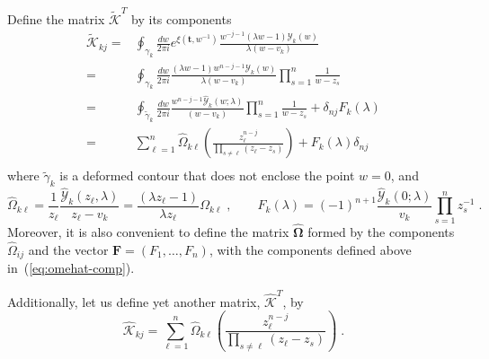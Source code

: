 \documentclass[a4paper,12pt]{amsart}
\begin{document}
Define the matrix \(\widetilde{\bm{\mathcal{K}}}^T\) by its components
\begin{equation}
\label{eq:k-tilde}
  \begin{split}
    \widetilde{\mathcal{K}}_{kj} = &
\oint_{\gamma_k} \frac{dw}{2\pi i} e^{\xi(\bm{t}, w^{-1})} \frac{w^{- j -1} ( \lambda w - 1) \mathcal{Y}_k(w)}{\lambda(w - v_k)}
    \\
    = & \oint_{\gamma_k} \frac{dw}{2\pi i}  
    \frac{( \lambda w - 1) w^{n-j-1}\mathcal{Y}_k(w)}{\lambda(w - v_k)} \prod_{s=1}^n \frac{1}{w - z_s}  \\
    = &
    \oint_{\tilde \gamma_k} \frac{dw}{2\pi i}
    \frac{w^{n-j-1}\widehat{\mathcal{Y}}_k(w; \lambda)}{(w - v_k)} \prod_{s=1}^n \frac{1}{w - z_s} 
    + \delta_{nj} F_k(\lambda) \\
    = & \sum_{\ell = 1}^n  \widehat{\Omega}_{k \ell} \left( \frac{z_\ell^{n-j}}{\prod_{s\neq \ell} (z_\ell - z_s)} \right)
    + F_k(\lambda)\delta_{nj}  \\
  \end{split}
\end{equation}
where \(\tilde{\gamma}_k\) is a deformed contour that does not enclose
the point \(w = 0\), and
\begin{equation}
\label{eq:omehat-comp}
  \widehat{\Omega}_{k\ell}
  = \frac{1}{z_\ell} \frac{\widehat{\mathcal{Y}}_k(z_\ell, \lambda)}{z_\ell - v_k}
  = \frac{(\lambda z_\ell -1)}{\lambda z_\ell} {\Omega}_{k\ell} 
\; , \qquad 
 F_k(\lambda) = (-1)^{n+1} \frac{\widehat{\mathcal{Y}}_k(0; \lambda)}{v_k }  \prod_{s=1}^n z_s^{-1} \; .
\end{equation}
Moreover, it is also convenient to define the matrix
\(\widehat{\bm{\Omega}}\) formed by the components
\(\widehat{\Omega}_{ij}\) and
the vector \(\bm{F} = (F_1, \dots , F_n)\), 
with the components defined above in~(\ref{eq:omehat-comp}).

Additionally, let us define yet another matrix,
\(\widehat{\bm{\mathcal{K}}}^T\), by
\begin{equation}
    \widehat{\mathcal{K}}_{kj} = 
    \sum_{\ell = 1}^n  \widehat{\Omega}_{k \ell}
    \left( \frac{z_\ell^{n-j}}{\prod_{s\neq \ell} (z_\ell - z_s)} \right) \; .
\end{equation}
\end{document}

